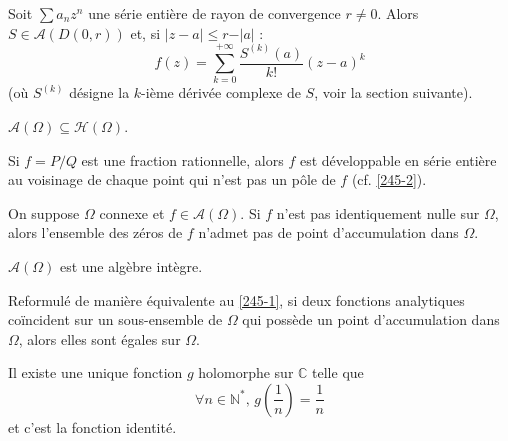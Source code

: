 	\begin{proposition}
		Soit $\sum a_n z^n$ une série entière de rayon de convergence $r \neq 0$. Alors $S \in \mathcal{A}(D(0, r))$ et, si $\vert z - a \vert \leq r - \vert a \vert$ :
		\[ f(z) = \sum_{k=0}^{+\infty} \frac{S^{(k)}(a)}{k!} (z-a)^k \]
		(où $S^{(k)}$ désigne la $k$-ième dérivée complexe de $S$, voir la section suivante).
	\end{proposition}


	\begin{proposition}
		$\mathcal{A}(\Omega) \subseteq \mathcal{H}(\Omega)$.
	\end{proposition}


	\begin{proposition}
		Si $f = P/Q$ est une fraction rationnelle, alors $f$ est développable en série entière au voisinage de chaque point qui n'est pas un pôle de $f$ (cf. \cref{245-2}).
	\end{proposition}


	\begin{theorem}
		\label{245-1}
		On suppose $\Omega$ connexe et $f \in \mathcal{A}(\Omega)$. Si $f$ n'est pas identiquement nulle sur $\Omega$, alors l'ensemble des zéros de $f$ n'admet pas de point d'accumulation dans $\Omega$.
	\end{theorem}


	\begin{corollary}
		$\mathcal{A}(\Omega)$ est une algèbre intègre.
	\end{corollary}


	\begin{remark}
		Reformulé de manière équivalente au \cref{245-1}, si deux fonctions analytiques coïncident sur un sous-ensemble de $\Omega$ qui possède un point d'accumulation dans $\Omega$, alors elles sont égales sur $\Omega$.
	\end{remark}


	\begin{example}
		Il existe une unique fonction $g$ holomorphe sur $\mathbb{C}$ telle que
		\[ \forall n \in \mathbb{N}^*, \, g\left( \frac{1}{n} \right) = \frac{1}{n} \]
		et c'est la fonction identité.
	\end{example}

